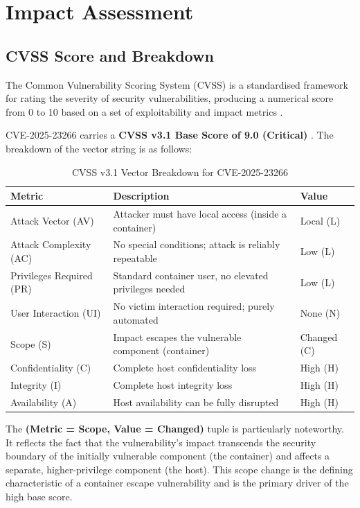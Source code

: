 \section{Impact Assessment}
\label{sec:impact}


\subsection{CVSS Score and Breakdown}
\label{subsec:cvss}

The Common Vulnerability Scoring System (CVSS) is a standardised framework for rating the severity of security vulnerabilities, producing a numerical score from 0 to 10 based on a set of exploitability and impact metrics \cite{cvss_v31_spec}.

CVE-2025-23266 carries a \textbf{CVSS v3.1 Base Score of 9.0 (Critical)} \cite{nvd_cve_2025_23266}. The breakdown of the vector string is as follows:
 
\begin{table}[H]
\centering
\caption{CVSS v3.1 Vector Breakdown for CVE-2025-23266}
\label{tab:cvss}
\begin{tabularx}{\textwidth}{lXl}
\toprule
\textbf{Metric} & \textbf{Description} & \textbf{Value} \\
\midrule
Attack Vector (AV) & Attacker must have local access (inside a container) & Local (L) \\
Attack Complexity (AC) & No special conditions; attack is reliably repeatable & Low (L) \\
Privileges Required (PR) & Standard container user, no elevated privileges needed & Low (L) \\
User Interaction (UI) & No victim interaction required; purely automated & None (N) \\
Scope (S) & Impact escapes the vulnerable component (container) & Changed (C) \\
Confidentiality (C) & Complete host confidentiality loss & High (H) \\
Integrity (I) & Complete host integrity loss & High (H) \\
Availability (A) & Host availability can be fully disrupted & High (H) \\
\bottomrule
\end{tabularx}
\end{table}

The \textbf{(Metric = Scope, Value = Changed)} tuple is particularly noteworthy. It reflects the fact that the vulnerability's impact transcends the security boundary of the initially vulnerable component (the container) and affects a separate, higher-privilege component (the host). This scope change is the defining characteristic of a container escape vulnerability and is the primary driver of the high base score.

